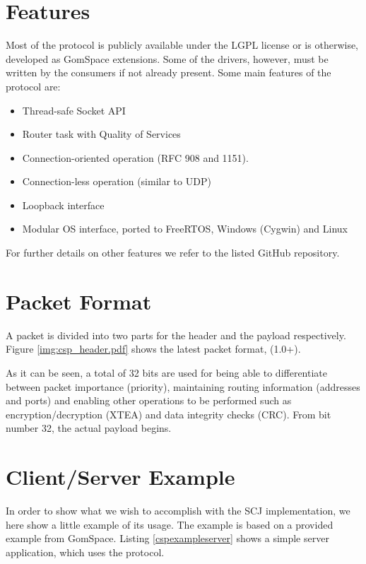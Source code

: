 \section{Features}
Most of the protocol is publicly available under the LGPL license or is otherwise, developed as GomSpace extensions. Some of the drivers, however, must be written by the consumers if not already present. Some main features of the protocol are:

\begin{itemize}
	\item Thread-safe Socket API
	\item Router task with Quality of Services
	\item Connection-oriented operation (RFC 908 and 1151).
	\item Connection-less operation (similar to UDP)
	\item Loopback interface
	\item Modular OS interface, ported to FreeRTOS, Windows (Cygwin) and Linux
\end{itemize}

For further details on other features we refer to the listed GitHub repository.

\section{Packet Format}
A packet is divided into two parts for the header and the payload respectively. Figure \ref{img:csp_header.pdf} shows the latest packet format, (1.0+).


As it can be seen, a total of 32 bits are used for being able to differentiate between packet importance (priority), maintaining routing information (addresses and ports) and enabling other operations to be performed such as encryption/decryption (XTEA) and data integrity checks (CRC). From bit number 32, the actual payload begins.

\section{Client/Server Example}
In order to show what we wish to accomplish with the SCJ implementation, we here show a little example of its usage. The example is based on a provided example from GomSpace\cite{GomSpace:CSP}. Listing \ref{cspexampleserver} shows a simple server application, which uses the protocol.

